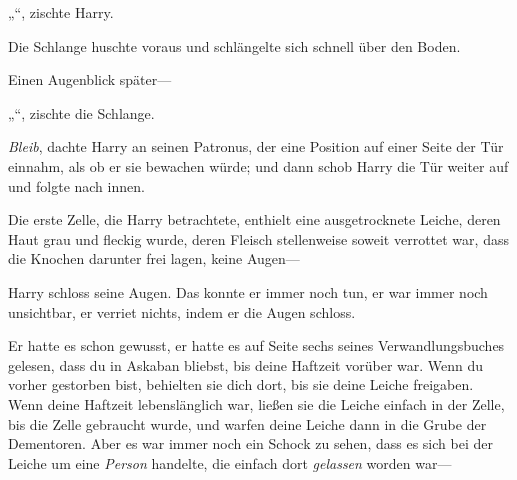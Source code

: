 „“, zischte Harry.

Die Schlange huschte voraus und schlängelte sich schnell über den Boden.

Einen Augenblick später—

„“, zischte die Schlange.

\emph{Bleib}, dachte Harry an seinen Patronus, der eine Position auf einer Seite der Tür einnahm, als ob er sie bewachen würde; und dann schob Harry die Tür weiter auf und folgte nach innen.

Die erste Zelle, die Harry betrachtete, enthielt eine ausgetrocknete Leiche, deren Haut grau und fleckig wurde, deren Fleisch stellenweise soweit verrottet war, dass die Knochen darunter frei lagen, keine Augen—

Harry schloss seine Augen. Das konnte er immer noch tun, er war immer noch unsichtbar, er verriet nichts, indem er die Augen schloss.

Er hatte es schon gewusst, er hatte es auf Seite sechs seines Verwandlungsbuches gelesen, dass du in Askaban bliebst, bis deine Haftzeit vorüber war. Wenn du vorher gestorben bist, behielten sie dich dort, bis sie deine Leiche freigaben. Wenn deine Haftzeit lebenslänglich war, ließen sie die Leiche einfach in der Zelle, bis die Zelle gebraucht wurde, und warfen deine Leiche dann in die Grube der Dementoren. Aber es war immer noch ein Schock zu sehen, dass es sich bei der Leiche um eine \emph{Person} handelte, die einfach dort \emph{gelassen} worden war—

